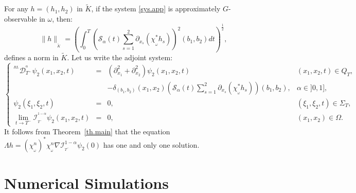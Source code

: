 \documentclass{article}
\begin{document}
For any $h=(h_1,h_2)$ in $\tilde{K}$, if the system \eqref{sys.app} 
is approximately $G$-observable in $\omega$, then: 
$$
\|h\|_{_{\tilde{K}}} 
= \left( \displaystyle\int_{0}^{T} \left(\mathcal{S}_\alpha(t)
\sum_{s=1}^{2} \partial_{x_s}(\chi_{_\omega}^*h_s)\right)^2(b_1,b_2) 
dt\right)^{\frac{1}{2}},
$$
defines a norm in $\tilde{K}$. Let us write the adjoint system:
\begin{equation*}
\left\{\begin{array}{rlll}
^{^{RL}}\mathcal{D}_{T^-}^{^\alpha}\psi_2(x_1,x_2,t) 
&=& \left(\partial_{x_1}^2 + \partial_{x_2}^2 \right)\psi_2(x_1,x_2,t)  
& (x_1,x_2,t)\in Q_T,\\ 
&  &  - \delta_{(b_1,b_2)}(x_1,x_2)\left(\mathcal{S}_\alpha(t)
\displaystyle\sum_{s=1}^{2}\partial_{x_s}(\chi_{_\omega}^*h_s)\right)(b_1,b_2), 
& \alpha\in]0,1],\\
\psi_2(\xi_1,\xi_2,t)& =& 0,  & (\xi_1,\xi_2,t)\in \Sigma_T, \\
\lim\limits_{t\rightarrow T^-}\mathcal{I}_{_{T^-}}^{^{1-\alpha}}\psi_2(x_1,x_2,t) 
&=& 0, & (x_1,x_2)\in\Omega.
\end{array}\right.
\end{equation*} 
It follows from Theorem~\ref{th.main} that the equation 
$\Lambda h = (\chi_{_\omega}^{n})^*\chi_{_\omega}^{n}
\nabla\mathcal{I}_{_{T^-}}^{1-\alpha}\psi_2(0)$ 
has one and only one solution.


\section{Numerical Simulations}
\label{sec:7}
\end{document}
